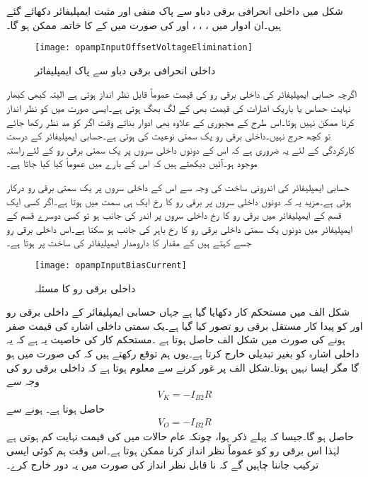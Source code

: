 شکل  میں داخلی انحرافی برقی دباو سے پاک منفی اور مثبت ایمپلیفائر دکھائے گئے ہیں۔ان ادوار میں ، ، ،  اور   کی صورت میں  کے  کا خاتمہ ممکن ہو گا۔ 
\begin{figure}
\centering
\texttt{[image: opampInputOffsetVoltageElimination]}
\caption{داخلی انحرافی برقی دباو سے پاک ایمپلیفائر}
\label{شکل_داخلی_انحرافی_برقی_دباو_سے_پاک_ایمپلیفائر}
\end{figure}
 

اگرچہ حسابی ایمپلیفائر کی داخلی برقی رو   کی قیمت عموماً قابل نظر انداز ہوتی ہے البتہ کبھی کبھار نہایت حساس یا باریک اشارات کی قیمت بھی کے لگ بھگ ہوتی ہے۔ایسی صورت میں کو نظر انداز کرنا ممکن نہیں ہوتا۔اس طرح کے مجبوری کے علاوہ بھی ادوار بناتے وقت اگر  کو مد نظر رکھا جائے تو کچھ حرج نہیں۔داخلی برقی رو یک سمتی نوعیت کی ہوتی ہے۔حسابی ایمپلیفائر کے درست کارکردگی کے لئے یہ ضروری ہے کہ اس کے دونوں داخلی سروں  پر یک سمتی برقی رو کے لئے راستہ موجود ہو۔آئیں دیکھتے ہیں کہ اس  کے بارے میں عموماً کیا کیا جاتا ہے۔

حسابی ایمپلیفائر کی اندرونی ساخت کی وجہ سے اس کے داخلی سروں پر یک سمتی برقی رو درکار ہوتی ہے۔مزید یہ کہ دونوں داخلی سروں پر برقی رو کا رخ ایک ہی سمت میں ہوتا ہے۔اگر کسی ایک قسم کے ایمپلیفائر میں برقی رو کا رخ داخلی سروں پر اندر کی جانب ہو تو کسی دوسرے قسم کے ایمپلیفائر میں دونوں یک سمتی داخلی برقی رو کا رخ باہر  کی جانب ہو سکتا ہے۔اس داخلی برقی رو جسے  کہتے ہیں کے مقدار کا دارومدار ایمپلیفائر کی ساخت پر ہوتا ہے۔
\begin{figure}
\centering
\texttt{[image: opampInputBiasCurrent]}
\caption{داخلی برقی رو کا مسئلہ}
\label{شکل_داخلی_برقی_رو_کا_مسئلہ}
\end{figure}
شکل  الف میں مستحکم کار دکھایا گیا ہے جہاں حسابی ایمپلیفائر کے داخلی برقی رو  اور کو پیدا کار مستقل برقی رو  تصور کیا گیا ہے۔یک سمتی داخلی اشارہ  کی قیمت صفر ہونے کی صورت میں  شکل  الف     حاصل ہوتا  ہے ۔مستحکم کار کی خاصیت یہ ہے کہ یہ داخلی اشارہ کو بغیر تبدیلی خارج کرتا ہے۔یوں ہم توقع رکھتے ہیں کہ  کی صورت میں  ہو گا مگر ایسا نہیں ہوتا۔شکل  الف     پر غور کرنے سے معلوم ہوتا ہے کہ داخلی برقی رو کی وجہ سے
\begin{align*}
V_K=-I_{B2} R
\end{align*}
حاصل ہوتا ہے۔  ہونے سے
\begin{align} \label{مساوات_انحرافی_رو_سے_پیدا_دباو}
V_O=-I_{B2}R
\end{align}
حاصل ہو گا۔جیسا کہ پہلے ذکر ہوا، چونکہ عام حالات میں  کی قیمت نہایت کم ہوتی ہے لہٰذا اس برقی رو کو عموماً نظر انداز کرنا ممکن ہوتا ہے۔اس وقت ہم کوئی ایسی ترکیب جاننا چاہیں گے کہ نا قابل نظر انداز  کی صورت میں یہ دور خارج کرے۔

